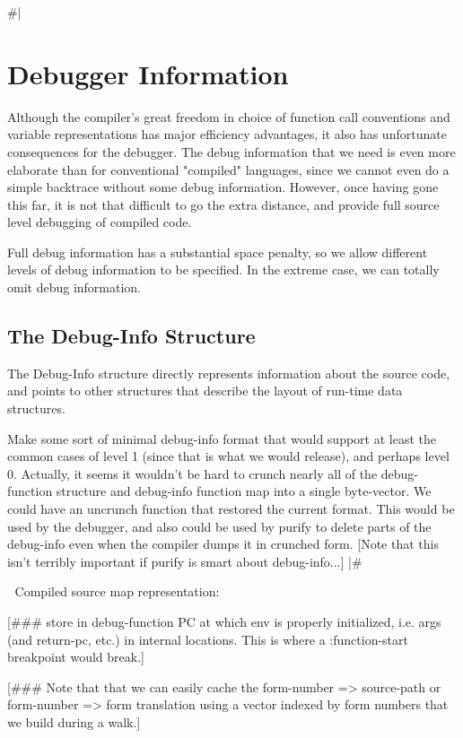
\#|
\chapter{Debugger Information}
\label{debug-info}

Although the compiler's great freedom in choice of function call conventions
and variable representations has major efficiency advantages, it also has
unfortunate consequences for the debugger.  The debug information that we need
is even more elaborate than for conventional "compiled" languages, since we
cannot even do a simple backtrace without some debug information.  However,
once having gone this far, it is not that difficult to go the extra distance,
and provide full source level debugging of compiled code.

Full debug information has a substantial space penalty, so we allow different
levels of debug information to be specified.  In the extreme case, we can
totally omit debug information.


\section{The Debug-Info Structure}

The Debug-Info structure directly represents information about the
source code, and points to other structures that describe the layout of
run-time data structures.


Make some sort of minimal debug-info format that would support at least the
common cases of level 1 (since that is what we would release), and perhaps
level 0.  Actually, it seems it wouldn't be hard to crunch nearly all of the
debug-function structure and debug-info function map into a single byte-vector.
We could have an uncrunch function that restored the current format.  This
would be used by the debugger, and also could be used by purify to delete parts
of the debug-info even when the compiler dumps it in crunched form.
[Note that this isn't terribly important if purify is smart about
debug-info...]
|\#


Compiled source map representation:

[\#\#\# store in debug-function PC at which env is properly initialized, i.e.
args (and return-pc, etc.) in internal locations.  This is where a
:function-start breakpoint would break.]

[\#\#\# Note that that we can easily cache the form-number => source-path or
form-number => form translation using a vector indexed by form numbers that we
build during a walk.]




